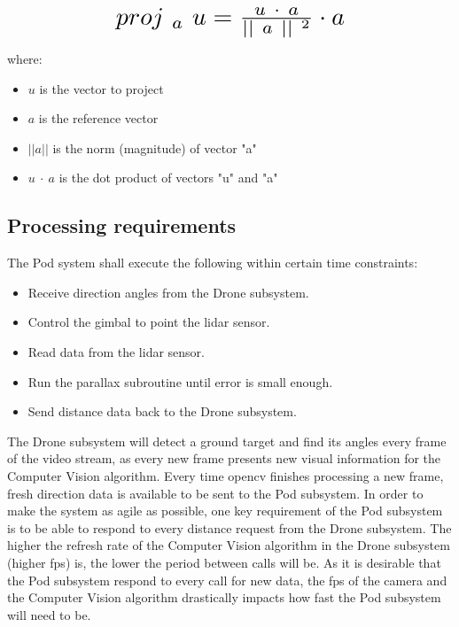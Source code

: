 \begin{equation}
  \label{eq:projection}
  \addequationtoentry{Vector projection} %
  \scalebox{2}{$ proj~_a~u= \frac{u~\cdot~a}{||~a~||~^2} \cdot a $}
\end{equation}

where:

\begin{itemize}
  \item $u$ is the vector to project
  \item $a$ is the reference vector
  \item $||a||$ is the norm (magnitude) of vector "a"
  \item $u~\cdot~a$ is the dot product of vectors "u" and "a" 
\end{itemize}

\subsection{Processing requirements}

The Pod system shall execute the following within certain time constraints:

\begin{itemize}
  \item Receive direction angles from the Drone subsystem.
  \item Control the gimbal to point the \gls{lidar} sensor.
  \item Read data from the \gls{lidar} sensor.
  \item Run the parallax subroutine until error is small enough.
  \item Send distance data back to the Drone subsystem.
\end{itemize}

The Drone subsystem will detect a ground target and find its angles every frame of the video
stream, as every new frame presents new visual information for the Computer Vision algorithm.
Every time \gls{opencv} finishes processing a new frame, fresh direction data is available
to be sent to the Pod subsystem. In order to make the system as agile as possible, one key
requirement of the Pod subsystem is to be able to respond to every distance request from the
Drone subsystem. The higher the refresh rate of the Computer Vision algorithm in the Drone
subsystem (higher \gls{fps}) is, the lower the period between calls will be. As it is
desirable that the Pod subsystem respond to every call for new data, the \gls{fps} of the
camera and the Computer Vision algorithm drastically impacts how fast the Pod subsystem
will need to be.

